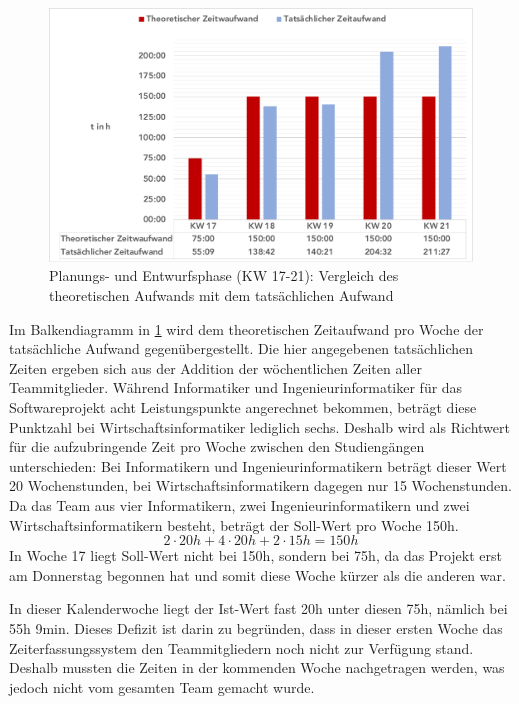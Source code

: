 \documentclass[../review_2.tex]{subfiles}
\begin{document}
\begin{figure} [h]
    \centering
    \includegraphics[width = \linewidth]{img/Kimai2.pdf}
    \caption{Planungs- und Entwurfsphase (KW 17-21): Vergleich des theoretischen Aufwands mit dem tatsächlichen Aufwand}
    \label{sollist}
\end{figure} 

Im Balkendiagramm in \ref{sollist} wird dem theoretischen Zeitaufwand pro Woche der tatsächliche Aufwand gegenübergestellt. Die hier angegebenen tatsächlichen Zeiten ergeben sich aus der Addition der wöchentlichen Zeiten aller Teammitglieder.
Während Informatiker und Ingenieurinformatiker für das Softwareprojekt acht Leistungspunkte angerechnet bekommen, beträgt diese Punktzahl bei Wirtschaftsinformatiker lediglich sechs. Deshalb wird als Richtwert für die aufzubringende Zeit pro Woche zwischen den Studiengängen unterschieden: Bei Informatikern und Ingenieurinformatikern beträgt dieser Wert 20 Wochenstunden, bei Wirtschaftsinformatikern dagegen nur 15 Wochenstunden.
Da das Team aus vier Informatikern, zwei Ingenieurinformatikern und zwei Wirtschaftsinformatikern besteht, beträgt der Soll-Wert pro Woche 150h.
\begin{equation*}
    2\cdot 20h + 4\cdot 20h + 2\cdot 15h = 150h
\end{equation*}
In Woche 17 liegt Soll-Wert nicht bei 150h, sondern bei 75h, da das Projekt erst am Donnerstag begonnen hat und somit diese Woche kürzer als die anderen war.

In dieser Kalenderwoche liegt der Ist-Wert fast 20h unter diesen 75h, nämlich bei 55h 9min. Dieses Defizit ist darin zu begründen, dass in dieser ersten Woche das Zeiterfassungssystem den Teammitgliedern noch nicht zur Verfügung stand. Deshalb mussten die Zeiten in der kommenden Woche nachgetragen werden, was jedoch nicht vom gesamten Team gemacht wurde.
\end{document}
